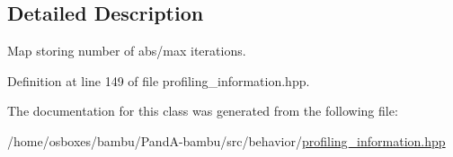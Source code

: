 \subsection{Detailed Description}
Map storing number of abs/max iterations. 

Definition at line 149 of file profiling\+\_\+information.\+hpp.



The documentation for this class was generated from the following file\+:\begin{DoxyCompactItemize}
\item 
/home/osboxes/bambu/\+Pand\+A-\/bambu/src/behavior/\hyperlink{profiling__information_8hpp}{profiling\+\_\+information.\+hpp}\end{DoxyCompactItemize}
